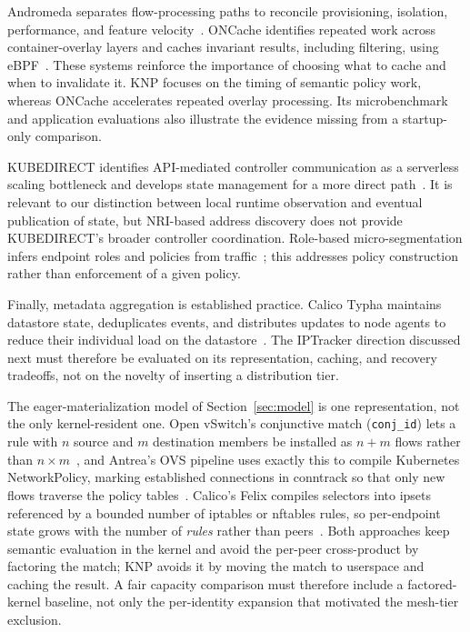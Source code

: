 \documentclass[letterpaper,twocolumn,10pt]{article}
\newcommand{\sys}{\textsc{KNP}}
\begin{document}
Andromeda separates flow-processing paths to reconcile provisioning,
isolation, performance, and feature velocity~\cite{dalton2018andromeda}.
ONCache identifies repeated work across container-overlay layers and
caches invariant results, including filtering, using
eBPF~\cite{oncache2025}. These systems reinforce the importance of
choosing what to cache and when to invalidate it. \sys{} focuses on
the timing of semantic policy work, whereas ONCache accelerates repeated
overlay processing. Its microbenchmark and application evaluations
also illustrate the evidence missing from a startup-only comparison.

KUBEDIRECT identifies API-mediated controller communication as a
serverless scaling bottleneck and develops state management for a
more direct path~\cite{kubedirect2026}. It is relevant to our distinction
between local runtime observation and eventual publication of state,
but NRI-based address discovery does not provide KUBEDIRECT's broader
controller coordination. Role-based micro-segmentation infers endpoint
roles and policies from traffic~\cite{mani2025microsegmentation}; this
addresses policy construction rather than enforcement of a given policy.

Finally, metadata aggregation is established practice. Calico Typha
maintains datastore state, deduplicates events, and distributes updates
to node agents to reduce their individual load on the
datastore~\cite{calicotypha}. The IPTracker direction discussed next
must therefore be evaluated on its representation, caching, and
recovery tradeoffs, not on the novelty of inserting a distribution tier.

The eager-materialization model of Section~\ref{sec:model} is one
representation, not the only kernel-resident one. Open vSwitch's
conjunctive match (\texttt{conj\_id}) lets a rule with $n$ source and
$m$ destination members be installed as $n+m$ flows rather than
$n\times m$~\cite{ovsfields}, and Antrea's OVS pipeline uses exactly
this to compile Kubernetes NetworkPolicy, marking established
connections in conntrack so that only new flows traverse the policy
tables~\cite{antreapipeline}. Calico's Felix compiles selectors into
ipsets referenced by a bounded number of iptables or nftables rules, so
per-endpoint state grows with the number of \emph{rules} rather than
peers~\cite{calicoarch}. Both approaches keep semantic evaluation in
the kernel and avoid the per-peer cross-product by factoring the match;
\sys{} avoids it by moving the match to userspace and caching the
result. A fair capacity comparison must therefore include a
factored-kernel baseline, not only the per-identity expansion that
motivated the mesh-tier exclusion.
\end{document}
